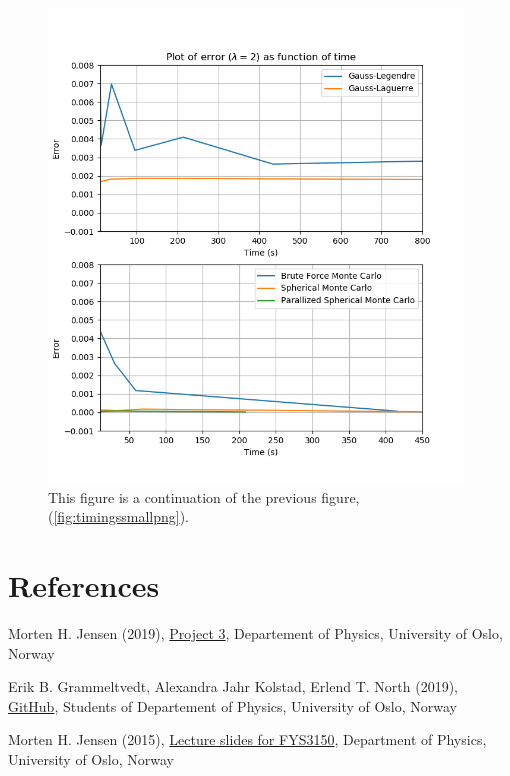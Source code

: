 \documentclass{article}
\begin{document}
\begin{figure}[ht]
    \centering
    \includegraphics[width = 11cm]{images/method-timings-large.png}
    \caption{This figure is a continuation of the previous figure, (\ref{fig:timingssmallpng}). }
    \label{fig:timingslargepng}
\end{figure}



\vspace{1cm}

\section{References} \label{sec:References}

\begin{thebibliography}{}

Morten H. Jensen (2019), \href{https://github.com/CompPhysics/ComputationalPhysics/blob/master/doc/Projects/2019/Project3/pdf/Project3.pdf}{Project 3}, Departement of Physics, University of Oslo, Norway

Erik B. Grammeltvedt, Alexandra Jahr Kolstad, Erlend T. North (2019), \href{https://github.com/Erikbgram/Fys3150}{GitHub}, Students of Departement of Physics, University of Oslo, Norway

Morten H. Jensen (2015), \href{https://github.com/CompPhysics/ComputationalPhysics/blob/master/doc/Lectures/lectures2015.pdf}{Lecture slides for FYS3150}, Department of Physics, University of Oslo, Norway

\end{thebibliography}




\end{document}
